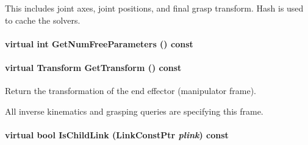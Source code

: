 This includes joint axes, joint positions, and final grasp transform. Hash is used to cache the solvers. \hypertarget{classOpenRAVE_1_1RobotBase_1_1Manipulator_ab73a54e94fe2be07ec7dc08220585ae9}{
\paragraph[{GetNumFreeParameters}]{\setlength{\rightskip}{0pt plus 5cm}virtual int GetNumFreeParameters () const}\hfill}
\label{classOpenRAVE_1_1RobotBase_1_1Manipulator_ab73a54e94fe2be07ec7dc08220585ae9}
\hypertarget{classOpenRAVE_1_1RobotBase_1_1Manipulator_a2206c7317f62f083c3f57868ba82bfee}{
\paragraph[{GetTransform}]{\setlength{\rightskip}{0pt plus 5cm}virtual Transform GetTransform () const}\hfill}
\label{classOpenRAVE_1_1RobotBase_1_1Manipulator_a2206c7317f62f083c3f57868ba82bfee}


Return the transformation of the end effector (manipulator frame). 

All inverse kinematics and grasping queries are specifying this frame. \hypertarget{classOpenRAVE_1_1RobotBase_1_1Manipulator_a63a72836eeef2579aff6424767e91007}{
\paragraph[{IsChildLink}]{\setlength{\rightskip}{0pt plus 5cm}virtual bool IsChildLink (LinkConstPtr {\em plink}) const}\hfill}
\label{classOpenRAVE_1_1RobotBase_1_1Manipulator_a63a72836eeef2579aff6424767e91007}


